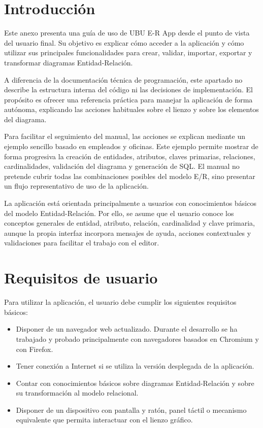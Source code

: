 
\section{Introducción}

Este anexo presenta una guía de uso de UBU E-R App desde el punto de vista del usuario final. Su objetivo es explicar cómo acceder a la aplicación y cómo utilizar sus principales funcionalidades para crear, validar, importar, exportar y transformar diagramas Entidad-Relación.

A diferencia de la documentación técnica de programación, este apartado no describe la estructura interna del código ni las decisiones de implementación. El propósito es ofrecer una referencia práctica para manejar la aplicación de forma autónoma, explicando las acciones habituales sobre el lienzo y sobre los elementos del diagrama.

Para facilitar el seguimiento del manual, las acciones se explican mediante un ejemplo sencillo basado en empleados y oficinas. Este ejemplo permite mostrar de forma progresiva la creación de entidades, atributos, claves primarias, relaciones, cardinalidades, validación del diagrama y generación de SQL. El manual no pretende cubrir todas las combinaciones posibles del modelo E/R, sino presentar un flujo representativo de uso de la aplicación.

La aplicación está orientada principalmente a usuarios con conocimientos básicos del modelo Entidad-Relación. Por ello, se asume que el usuario conoce los conceptos generales de entidad, atributo, relación, cardinalidad y clave primaria, aunque la propia interfaz incorpora mensajes de ayuda, acciones contextuales y validaciones para facilitar el trabajo con el editor.

\section{Requisitos de usuario}

Para utilizar la aplicación, el usuario debe cumplir los siguientes requisitos básicos:

\begin{itemize}
    \item Disponer de un navegador web actualizado. Durante el desarrollo se ha trabajado y probado principalmente con navegadores basados en Chromium y con Firefox.

    \item Tener conexión a Internet si se utiliza la versión desplegada de la aplicación.

    \item Contar con conocimientos básicos sobre diagramas Entidad-Relación y sobre su transformación al modelo relacional.

    \item Disponer de un dispositivo con pantalla y ratón, panel táctil o mecanismo equivalente que permita interactuar con el lienzo gráfico.
\end{itemize}

